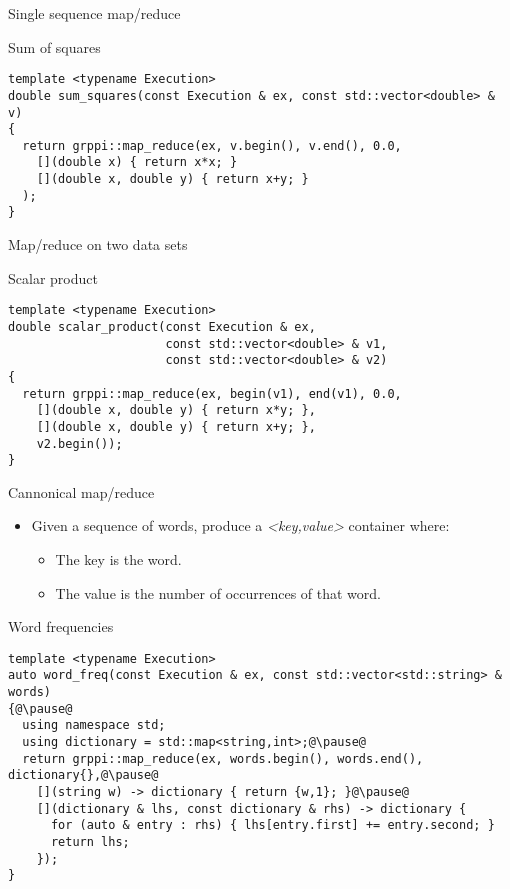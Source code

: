 \begin{frame}[t,fragile]{Single sequence map/reduce}
\begin{block}{Sum of squares}
\begin{lstlisting}
template <typename Execution>
double sum_squares(const Execution & ex, const std::vector<double> & v)
{
  return grppi::map_reduce(ex, v.begin(), v.end(), 0.0,
    [](double x) { return x*x; }
    [](double x, double y) { return x+y; }
  );
}
\end{lstlisting}
\end{block}
\end{frame}

\begin{frame}[t,fragile]{Map/reduce on two data sets}
\begin{block}{Scalar product}
\begin{lstlisting}
template <typename Execution>
double scalar_product(const Execution & ex,
                      const std::vector<double> & v1,
                      const std::vector<double> & v2)
{
  return grppi::map_reduce(ex, begin(v1), end(v1), 0.0,
    [](double x, double y) { return x*y; },
    [](double x, double y) { return x+y; },
    v2.begin());
}
\end{lstlisting}
\end{block}
\end{frame}

\begin{frame}[t,fragile]{Cannonical map/reduce}
\begin{itemize}
  \item Given a sequence of words, produce a \emph{<key,value>} container where:
    \begin{itemize}
      \item The key is the word.
      \item The value is the number of occurrences of that word.
    \end{itemize}
\end{itemize}
\vfill\pause
\begin{block}{Word frequencies}
\begin{lstlisting}[escapechar=@]
template <typename Execution>
auto word_freq(const Execution & ex, const std::vector<std::string> & words)
{@\pause@
  using namespace std;
  using dictionary = std::map<string,int>;@\pause@
  return grppi::map_reduce(ex, words.begin(), words.end(), dictionary{},@\pause@
    [](string w) -> dictionary { return {w,1}; }@\pause@
    [](dictionary & lhs, const dictionary & rhs) -> dictionary {
      for (auto & entry : rhs) { lhs[entry.first] += entry.second; }
      return lhs;
    });
}
\end{lstlisting}
\end{block}
\end{frame}
